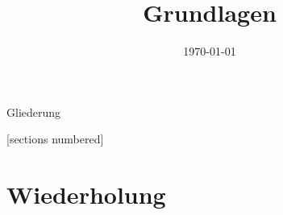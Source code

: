 



\title{Grundlagen}
\date{\today}
\setlength{\columnsep}{.4cm}



\maketitle

\begin{frame}{Gliederung}
	\begin{multicols}{2}
		[sections numbered]
		\tableofcontents
	\end{multicols}
\end{frame}


\section{Wiederholung}
